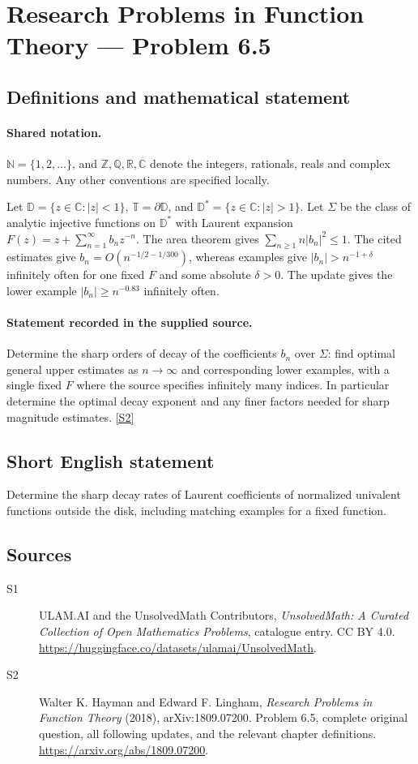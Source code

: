 \documentclass[11pt]{book}
\newcommand{\sref}[2]{\hyperlink{source:#1:#2}{[S#2]}}
\begin{document}
\section{Research Problems in Function Theory — Problem 6.5}\label{statement}

\subsection{Definitions and mathematical statement}

\paragraph{Shared notation.}$\mathbb N=\{1,2,\ldots\}$, and $\mathbb Z,\mathbb Q,\mathbb R,\mathbb C$ denote the integers, rationals, reals and complex numbers. Any other conventions are specified locally.


Let $\mathbb D=\{z\in\mathbb C:|z|<1\}$, $\mathbb T=\partial\mathbb D$, and $\mathbb D^*=\{z\in\mathbb C:|z|>1\}$. Let $\Sigma$ be the class of analytic injective functions on $\mathbb D^*$ with Laurent expansion $F(z)=z+\sum_{n=1}^{\infty}b_nz^{-n}$. The area theorem gives $\sum_{n\ge1}n|b_n|^2\le1$. The cited estimates give $b_n=O(n^{-1/2-1/300})$, whereas examples give $|b_n|>n^{-1+\delta}$ infinitely often for one fixed $F$ and some absolute $\delta>0$. The update gives the lower example $|b_n|\ge n^{-0.83}$ infinitely often.
\paragraph{Statement recorded in the supplied source.}
Determine the sharp orders of decay of the coefficients $b_n$ over $\Sigma$: find optimal general upper estimates as $n\to\infty$ and corresponding lower examples, with a single fixed $F$ where the source specifies infinitely many indices. In particular determine the optimal decay exponent and any finer factors needed for sharp magnitude estimates. \sref{statement}{2}
\subsection{Short English statement}
Determine the sharp decay rates of Laurent coefficients of normalized univalent functions outside the disk, including matching examples for a fixed function.
\subsection{Sources}
\begin{description}
\item[\hypertarget{source:statement:1}{S1}] ULAM.AI and the UnsolvedMath Contributors, \emph{UnsolvedMath: A Curated Collection of Open Mathematics Problems}, catalogue entry. CC BY 4.0. \url{https://huggingface.co/datasets/ulamai/UnsolvedMath}.
\item[\hypertarget{source:statement:2}{S2}] Walter K. Hayman and Edward F. Lingham, \emph{Research Problems in Function Theory} (2018), arXiv:1809.07200. Problem 6.5, complete original question, all following updates, and the relevant chapter definitions. \url{https://arxiv.org/abs/1809.07200}.
\end{description}
\label{end:statement}
\end{document}
